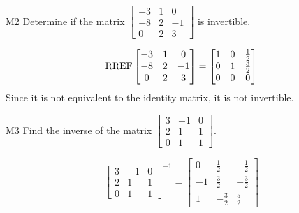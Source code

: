 \documentclass{sbgLAquiz}
\begin{document}
\begin{problem}{M2}
Determine if the matrix $\begin{bmatrix}-3 & 1 & 0 \\ -8 & 2 & -1 \\ 0 & 2 & 3\end{bmatrix}$ is invertible.
\end{problem}
\begin{solution}
$$\operatorname{RREF} \begin{bmatrix}-3 & 1 & 0 \\ -8 & 2 & -1 \\ 0 & 2 & 3\end{bmatrix} = \begin{bmatrix} 1 & 0 & \frac{1}{2} \\ 0 & 1 & \frac{3}{2} \\ 0 & 0 & 0 \end{bmatrix}$$
Since it is not equivalent to the identity matrix, it is not invertible.
\end{solution}


\begin{extract}\newpage\end{extract}
\begin{problem}{M3}
Find the inverse of the matrix $\begin{bmatrix} 3 & -1 & 0  \\ 2 & 1 & 1  \\ 0 & 1 & 1   \end{bmatrix}$.
\end{problem}
\begin{solution} 
$$\begin{bmatrix} 3 & -1 & 0  \\ 2 & 1 & 1  \\ 0 & 1 & 1   \end{bmatrix}^{-1} = \begin{bmatrix} 0 & \frac{1}{2} & -\frac{1}{2} \\ -1 & \frac{3}{2} & -\frac{3}{2} \\ 1 & -\frac{3}{2} & \frac{5}{2}\end{bmatrix}$$
\end{solution}
\end{document}
